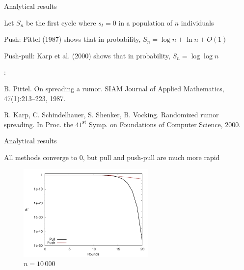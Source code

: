 \begin{frame}{Analytical results}

\begin{definition}
Let $S_n$ be the first cycle where $s_t=0$ in a population of $n$ individuals 
\BI
\item \alert{Push}: Pittel (1987) shows that in probability, $S_n = \log n + \ln n + O(1)$
\item \alert{Push-pull}: Karp et al. (2000) shows that in probability, $S_n = \log \log n$
\EI
\end{definition}

\bigskip
{\footnotesize
{}:
\BI
\item B. Pittel. \alert{On spreading a rumor}. SIAM Journal of Applied Mathematics, 47(1):213–223, 1987.
\item R. Karp, C. Schindelhauer, S. Shenker, B. Vocking. \alert{Randomized
rumor spreading}. In Proc. the $41^{\textrm{st}}$ Symp. on
Foundations of Computer Science, 2000.
\EI
}



\end{frame}


\begin{frame}{Analytical results}


All methods converge to $0$, but pull and push-pull are much more rapid

\begin{figure}
\includegraphics[width=0.6\textwidth]{gnuplot}
\caption{$n=10\,000$}
\end{figure}

\end{frame}

